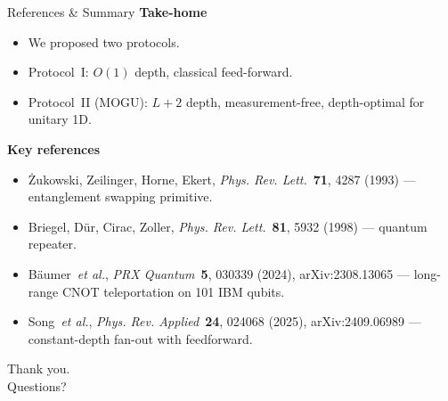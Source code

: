 \documentclass[aspectratio=169,10pt]{beamer}
\begin{document}

\begin{frame}[allowframebreaks]{References \& Summary}
  \textbf{Take-home}
  \begin{itemize}
    \item We proposed two protocols.
    \item Protocol~I: $O(1)$ depth, classical feed-forward.
    \item Protocol~II (MOGU): $L+2$ depth, measurement-free, depth-optimal for unitary 1D.
  \end{itemize}

  \medskip
  \textbf{Key references}
  \begin{itemize}\footnotesize
    \item Żukowski, Zeilinger, Horne, Ekert,
          \emph{Phys. Rev. Lett.}~\textbf{71}, 4287 (1993) — entanglement swapping primitive.
    \item Briegel, Dür, Cirac, Zoller,
          \emph{Phys. Rev. Lett.}~\textbf{81}, 5932 (1998) — quantum repeater.
    \item Bäumer~\textit{et al.},
          \emph{PRX Quantum}~\textbf{5}, 030339 (2024), arXiv:2308.13065 —
          long-range CNOT teleportation on 101 IBM qubits.
    \item Song~\textit{et al.},
          \emph{Phys. Rev. Applied}~\textbf{24}, 024068 (2025), arXiv:2409.06989 —
          constant-depth fan-out with feedforward.
  \end{itemize}

  \medskip
  \centering\Large Thank you. \\[0.3em]
  \small Questions?
\end{frame}
\end{document}
